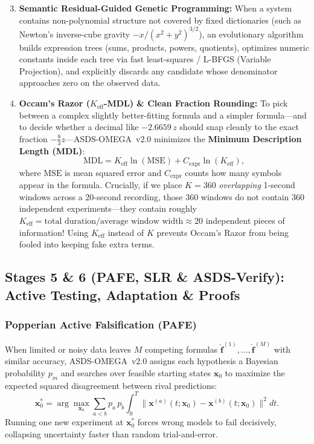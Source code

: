\documentclass[11pt,a4paper]{article}
\begin{document}
\begin{enumerate}
  \setcounter{enumi}{2}
  \item \textbf{Semantic Residual-Guided Genetic Programming:} When a system contains non-polynomial structure not covered by fixed dictionaries (such as Newton's inverse-cube gravity $-x/(x^2+y^2)^{3/2}$), an evolutionary algorithm builds expression trees (sums, products, powers, quotients), optimizes numeric constants inside each tree via fast least-squares / L-BFGS (Variable Projection), and explicitly discards any candidate whose denominator approaches zero on the observed data.
  \item \textbf{Occam's Razor ($K_{\text{eff}}$-MDL) \& Clean Fraction Rounding:} To pick between a complex slightly better-fitting formula and a simpler formula—and to decide whether a decimal like $-2.6659\,z$ should snap cleanly to the exact fraction $-\frac{8}{3}z$—ASDS-OMEGA~v2.0 minimizes the \textbf{Minimum Description Length (MDL)}:
  \begin{equation}
    \text{MDL} = K_{\text{eff}} \ln(\text{MSE}) + C_{\text{expr}} \ln(K_{\text{eff}}),
  \end{equation}
  where $\text{MSE}$ is mean squared error and $C_{\text{expr}}$ counts how many symbols appear in the formula. Crucially, if we place $K = 360$ \emph{overlapping} 1-second windows across a 20-second recording, those 360 windows do not contain 360 independent experiments—they contain roughly $K_{\text{eff}} = \text{total duration} / \text{average window width} \approx 20$ independent pieces of information! Using $K_{\text{eff}}$ instead of $K$ prevents Occam's Razor from being fooled into keeping fake extra terms.
\end{enumerate}

\subsection{Stages 5 \& 6 (PAFE, SLR \& ASDS-Verify): Active Testing, Adaptation \& Proofs}
\subsubsection{Popperian Active Falsification (PAFE)}
When limited or noisy data leaves $M$ competing formulas $\hat{\mathbf{f}}^{(1)}, \dots, \hat{\mathbf{f}}^{(M)}$ with similar accuracy, ASDS-OMEGA~v2.0 assigns each hypothesis a Bayesian probability $p_m$ and searches over feasible starting states $\mathbf{x}_0$ to maximize the expected squared disagreement between rival predictions:
\begin{equation}
  \mathbf{x}_0^* = \arg\max_{\mathbf{x}_0} \sum_{a < b} p_a\,p_b \int_0^T \big\|\mathbf{x}^{(a)}(t;\mathbf{x}_0) - \mathbf{x}^{(b)}(t;\mathbf{x}_0)\big\|^2 dt.
\end{equation}
Running one new experiment at $\mathbf{x}_0^*$ forces wrong models to fail decisively, collapsing uncertainty faster than random trial-and-error.
\end{document}
